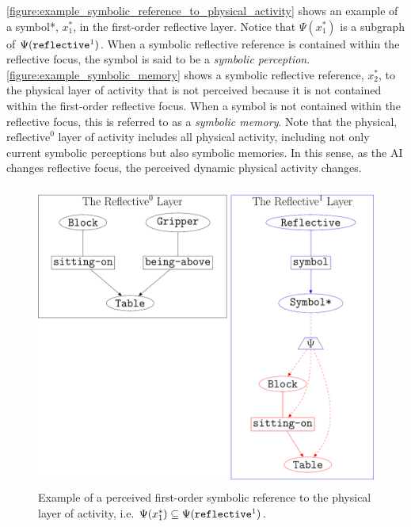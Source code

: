 {\mbox{\autoref{figure:example_symbolic_reference_to_physical_activity}}}
shows an example of a symbol*, $x_1^*$, in the first-order reflective
layer.  Notice that $\Psi(x_1^*)$ is a subgraph of
$\Psi(\text{\tt{reflective}}^1)$.  When a symbolic reflective
reference is contained within the reflective focus, the symbol is said
to be a \emph{symbolic perception}.
{\mbox{\autoref{figure:example_symbolic_memory}}} shows a symbolic
reflective reference, $x_2^*$, to the physical layer of activity that
is not perceived because it is not contained within the first-order
reflective focus.  When a symbol is not contained within the
reflective focus, this is referred to as a \emph{symbolic memory}.
Note that the physical, $\text{reflective}^0$ layer of activity
includes all physical activity, including not only current symbolic
perceptions but also symbolic memories.  In this sense, as the AI
changes reflective focus, the perceived dynamic physical activity
changes.
\begin{figure}
\center
\includegraphics[height=10cm]{gfx/example_symbolic_reference_to_physical_activity}
\caption{Example of a perceived first-order symbolic reference to the
  physical layer of activity,
  i.e. $\Psi(x_1^*)\subseteq\Psi(\text{\tt{reflective}}^1)$.}
\label{figure:example_symbolic_reference_to_physical_activity}
\end{figure}
